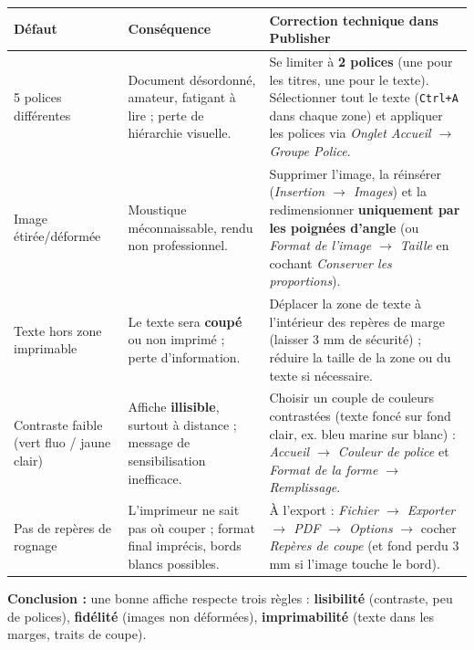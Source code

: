 \documentclass[11pt]{article}
\begin{document}
\begin{corrige}
\begin{center}
\begin{tabularx}{\linewidth}{|l|X|X|}
\hline
\rowcolor{popblueL} \textbf{Défaut} & \textbf{Conséquence} & \textbf{Correction technique dans Publisher} \\ \hline
5 polices différentes & Document désordonné, amateur, fatigant à lire ; perte de hiérarchie visuelle. & Se limiter à \textbf{2 polices} (une pour les titres, une pour le texte). Sélectionner tout le texte (\texttt{Ctrl+A} dans chaque zone) et appliquer les polices via \textit{Onglet Accueil $\rightarrow$ Groupe Police}. \\ \hline
Image étirée/déformée & Moustique méconnaissable, rendu non professionnel. & Supprimer l'image, la réinsérer (\textit{Insertion $\rightarrow$ Images}) et la redimensionner \textbf{uniquement par les poignées d'angle} (ou \textit{Format de l'image $\rightarrow$ Taille} en cochant \textit{Conserver les proportions}). \\ \hline
Texte hors zone imprimable & Le texte sera \textbf{coupé} ou non imprimé ; perte d'information. & Déplacer la zone de texte à l'intérieur des repères de marge (laisser 3 mm de sécurité) ; réduire la taille de la zone ou du texte si nécessaire. \\ \hline
Contraste faible (vert fluo / jaune clair) & Affiche \textbf{illisible}, surtout à distance ; message de sensibilisation inefficace. & Choisir un couple de couleurs contrastées (texte foncé sur fond clair, ex. bleu marine sur blanc) : \textit{Accueil $\rightarrow$ Couleur de police} et \textit{Format de la forme $\rightarrow$ Remplissage}. \\ \hline
Pas de repères de rognage & L'imprimeur ne sait pas où couper ; format final imprécis, bords blancs possibles. & À l'export : \textit{Fichier $\rightarrow$ Exporter $\rightarrow$ PDF $\rightarrow$ Options} $\rightarrow$ cocher \textit{Repères de coupe} (et fond perdu 3 mm si l'image touche le bord). \\ \hline
\end{tabularx}
\end{center}

\textbf{Conclusion :} une bonne affiche respecte trois règles : \textbf{lisibilité} (contraste, peu de polices), \textbf{fidélité} (images non déformées), \textbf{imprimabilité} (texte dans les marges, traits de coupe).
\end{corrige}
\end{document}
